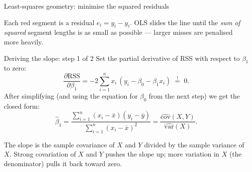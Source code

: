 \documentclass[aspectratio=169,11pt]{beamer}
\begin{document}
\begin{frame}{Least-squares geometry: minimise the squared residuals}
  \begin{center}
  \end{center}
  \begin{takeaway}
    Each red segment is a residual $e_i=y_i-\hat y_i$. OLS slides the
    line until the \emph{sum of squared} segment lengths is as small as
    possible --- larger misses are penalised more heavily.
  \end{takeaway}
\end{frame}


\begin{frame}{Deriving the slope: step 1 of 2}\label{frm:deriveslope}
  Set the partial derivative of RSS with respect to $\beta_1$ to zero:
  \[
    \frac{\partial \mathrm{RSS}}{\partial \beta_1}
      = -2 \sum_{i=1}^n x_i\,(y_i - \beta_0 - \beta_1 x_i) \;\stackrel{!}{=}\; 0.
  \]
  After simplifying (and using the equation for $\beta_0$ from the next
  step) we get the closed form:
  \[
    \boxed{\;
      \hat\beta_1
        = \frac{\sum_{i=1}^n (x_i - \bar x)(y_i - \bar y)}
               {\sum_{i=1}^n (x_i - \bar x)^2}
        = \frac{\widehat{\mathrm{cov}}(X, Y)}{\widehat{\mathrm{var}}(X)}.
    \;}
  \]
  \begin{readme}
    The slope is the sample covariance of $X$ and $Y$ divided by the
    sample variance of $X$. Strong covariation of $X$ and $Y$ pushes the slope up; more variation in
    $X$ (the denominator) pulls it back toward zero.
  \end{readme}
\end{frame}
\end{document}

